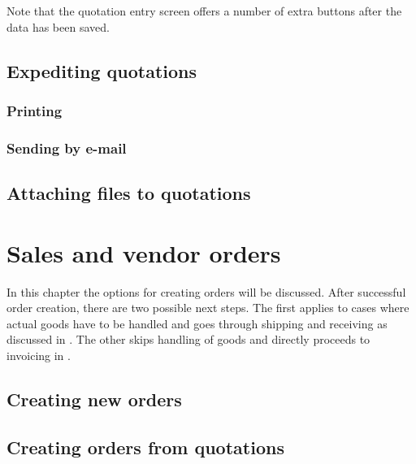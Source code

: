Note that the quotation entry screen offers a number of extra buttons after the data has
been saved.

\section{Expediting quotations}
\label{sec-business-processes-quotations-sending}

\subsection{Printing}
\label{subsec-business-processes-quotiontions-sending-print}

\subsection{Sending by e-mail}
\label{subsec-business-processes-quotations-sending-email}

\section{Attaching files to quotations}
\label{sec-business-processes-quotations-file-attachments}


\chapter{Sales and vendor orders}
\label{cha-business-processes-orders}

In this chapter the options for creating orders will be discussed.
After successful order creation, there are two possible next steps.
The first applies to cases where actual goods have to be handled
and goes through shipping and receiving as discussed in
. The other skips handling of goods
and directly proceeds to invoicing in .

\section{Creating new orders}
\label{sec-business-processes-orders-creation}

\section{Creating orders from quotations}
\label{sec-business-processes-orders-creation-from-quotations}

